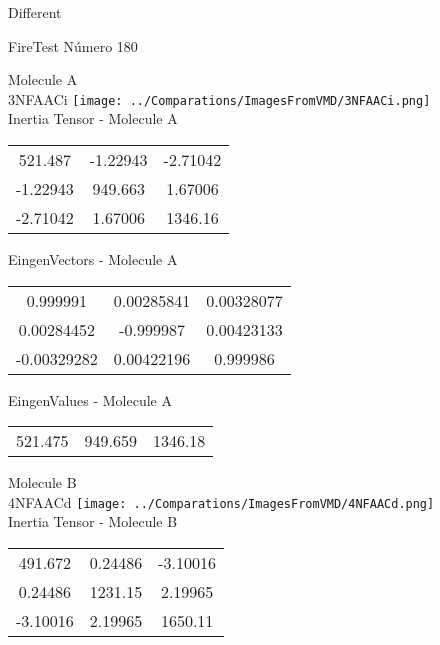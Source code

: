\begin{center}
\vtab
\vtab
\textcolor{NavyBlue}{\Large Different}
\end{center}

 \newpage

\vtab[-2cm]
\begin{center}
{\large FireTest \tab Número 180}
\end{center}
\begin{multicols}{2}
\begin{center}

Molecule A \\ 
3NFAACi
\texttt{[image: ../Comparations/ImagesFromVMD/3NFAACi.png]}
\\
Inertia Tensor - Molecule A \\
\vtab

\begin{tabular}{|c c c|}
521.487	 & 	-1.22943	 & 	-2.71042	 \\
-1.22943	 & 	949.663	 & 	1.67006	 \\
-2.71042	 & 	1.67006	 & 	1346.16
\end{tabular}

\vtab
 EingenVectors - Molecule A     \\
\vtab
\begin{tabular}{|c c c|}
0.999991	 & 	0.00285841	 & 	0.00328077	 \\
0.00284452	 & 	-0.999987	 & 	0.00423133	 \\
-0.00329282	 & 	0.00422196	 & 	0.999986
\end{tabular}

\vtab
 EingenValues - Molecule A     \\
\vtab
\begin{tabular}{|c c c|}
521.475	 & 	949.659	 & 	1346.18	 \\
\end{tabular}
\columnbreak

Molecule B \\ 
4NFAACd
\texttt{[image: ../Comparations/ImagesFromVMD/4NFAACd.png]}
\\
Inertia Tensor - Molecule B \\
\vtab

\begin{tabular}{|c c c|}
491.672	 & 	0.24486	 & 	-3.10016	 \\
0.24486	 & 	1231.15	 & 	2.19965	 \\
-3.10016	 & 	2.19965	 & 	1650.11
\end{tabular}


\end{center}
\end{multicols}
